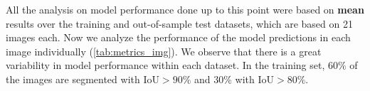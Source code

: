 All the analysis on model performance done up to this point were based on
\textbf{mean} results over the training and out-of-sample test datasets, which
are based on 21 images each. Now we analyze the performance of the model
predictions in each image individually (\cref{tab:metrics_img}). We observe
that there is a great variability in model performance within each dataset. In
the training set, $60\%$ of the images are segmented with IoU$>90\%$ and $30\%$
with IoU$>80\%$.

\begin{table}[H]
    \centering
    \caption[Performance of the consensus method]{Performance metrics for
        voting\_all model in segmenting
        individual images from training and testing datasets.}
    \label{tab:metrics_img}
\end{table}
